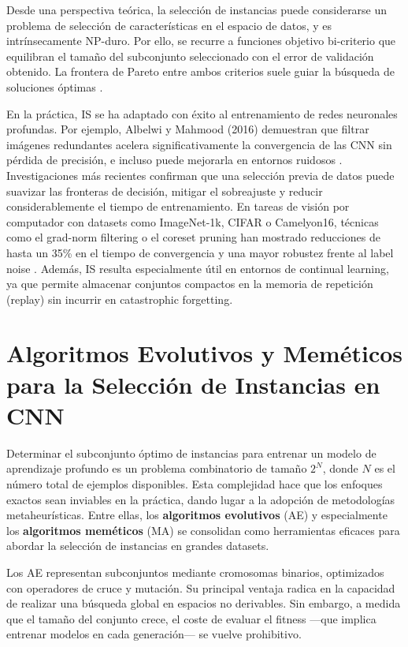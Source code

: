 Desde una perspectiva teórica, la selección de instancias puede considerarse un problema de selección de características en el espacio de datos, y es intrínsecamente NP-duro.
Por ello, se recurre a funciones objetivo bi-criterio que equilibran el tamaño del subconjunto seleccionado con el error de validación obtenido.
La frontera de Pareto entre ambos criterios suele guiar la búsqueda de soluciones óptimas \cite{https://www.igi-global.com/chapter/content/63814}.

En la práctica, IS se ha adaptado con éxito al entrenamiento de redes neuronales profundas.
Por ejemplo, Albelwi y Mahmood (2016) demuestran que filtrar imágenes redundantes acelera significativamente la convergencia de las CNN sin pérdida de precisión, e incluso puede mejorarla en entornos ruidosos \cite{https://www.mdpi.com/1099-4300/19/6/242}.
Investigaciones más recientes confirman que una selección previa de datos puede suavizar las fronteras de decisión, mitigar el sobreajuste y reducir considerablemente el tiempo de entrenamiento.
En tareas de visión por computador con datasets como ImageNet-1k, CIFAR o Camelyon16, técnicas como el grad-norm filtering o el coreset pruning han mostrado reducciones de hasta un 35\% en el tiempo de convergencia y una mayor robustez frente al label noise \cite{https://arxiv.org/html/2306.05175v3, https://arxiv.org/abs/1705.10694}.
Además, IS resulta especialmente útil en entornos de continual learning, ya que permite almacenar conjuntos compactos en la memoria de repetición (replay) sin incurrir en catastrophic forgetting.


\section{Algoritmos Evolutivos y Meméticos para la Selección de Instancias en CNN}

Determinar el subconjunto óptimo de instancias para entrenar un modelo de aprendizaje profundo es un problema combinatorio de tamaño $2^N$, donde $N$ es el número total de ejemplos disponibles.
Esta complejidad hace que los enfoques exactos sean inviables en la práctica, dando lugar a la adopción de metodologías metaheurísticas.
Entre ellas, los \textbf{algoritmos evolutivos} (AE) y especialmente los \textbf{algoritmos meméticos} (MA) se consolidan como herramientas eficaces para abordar la selección de instancias en grandes datasets.

Los AE representan subconjuntos mediante cromosomas binarios, optimizados con operadores de cruce y mutación.
Su principal ventaja radica en la capacidad de realizar una búsqueda global en espacios no derivables.
Sin embargo, a medida que el tamaño del conjunto crece, el coste de evaluar el fitness —que implica entrenar modelos en cada generación— se vuelve prohibitivo.

